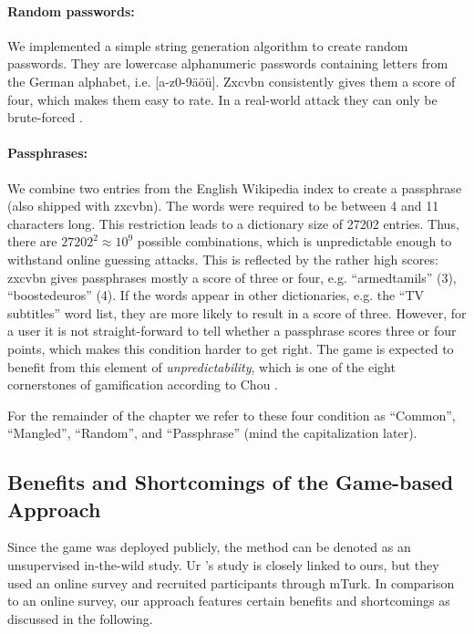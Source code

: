\paragraph{Random passwords: } We implemented a simple string generation algorithm to create random passwords. They are lowercase alphanumeric passwords containing letters from the German alphabet, i.e. [a-z0-9äöü]. Zxcvbn consistently gives them a score of four, which makes them easy to rate. In a real-world attack they can only be brute-forced \cite{Florencio2014AdministratorsGuide, Wheeler2016zxcvbn}.

\paragraph{Passphrases: } We combine two entries from the English Wikipedia index to create a passphrase (also shipped with zxcvbn). The words were required to be between 4 and 11 characters long. This restriction leads to a dictionary size of 27202 entries. Thus, there are $27202^2 \approx 10^9$ possible combinations, which is unpredictable enough to withstand online guessing attacks. This is reflected by the rather high scores: zxcvbn gives passphrases mostly a score of three or four, e.g. ``armedtamils'' (3), ``boostedeuros'' (4). If the words appear in other dictionaries, e.g. the ``TV subtitles'' word list, they are more likely to result in a score of three. However, for a user it is not straight-forward to tell whether a passphrase scores three or four points, which makes this condition harder to get right. The game is expected to benefit from this element of \textit{unpredictability}, which is one of the eight cornerstones of gamification according to Chou \cite{Chou2015Gamification}.

\vspace*{2ex}
For the remainder of the chapter we refer to these four condition as ``Common'', ``Mangled'', ``Random'', and ``Passphrase'' (mind the capitalization later).
\makeatother

\subsection{Benefits and Shortcomings of the Game-based Approach}\label{sec:pasdjo:beneftis_shortcomings_method}
Since the game was deployed publicly, the method can be denoted as an unsupervised in-the-wild study. Ur \etal's study is closely linked to ours, but they used an online survey and recruited participants through \gls{mTurk}. In comparison to an online survey, our approach features certain benefits and shortcomings as discussed in the following. 

